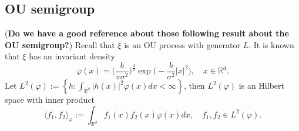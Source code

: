 \documentclass[12pt, a4paper]{amsart}
\theoremstyle{definition}
\numberwithin{equation}{section}
\begin{document}
\subsection{OU semigroup}
({\bf Do we have a good reference about those following result about the OU semigroup?})
Recall that $\xi$ is an OU process with generator $L$. It is known that $\xi$ has an invariant density
\begin{equation}\label{invariantdensity}
    \varphi (x) 
    =\Big (\frac{b}{\pi \sigma^2}\Big )^{\frac{d}{2}}\exp \Big(-\frac{b}{\sigma^2}|x|^2 \Big),\quad x\in \mathbb{R}^d.
\end{equation}
Let $L^2(\varphi):= \left\{ h: \int_{\mathbb{R}^d} |h(x)|^2 \varphi(x) dx < \infty \right\}$, then $L^2(\varphi)$ is an Hilbert space with inner product
\begin{equation}
\langle f_1, f_2 \rangle_{\varphi} 
:=
\int_{\mathbb{R}^d}f_1(x)f_2(x)\varphi(x) dx, \quad f_1,f_2 \in L^2(\varphi).
\end{equation}
\end{document}
